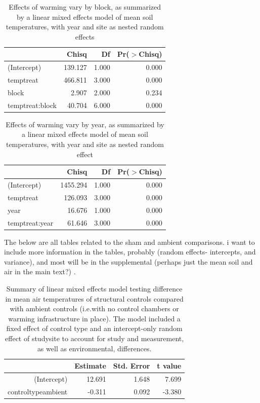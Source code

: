 \documentclass{article}
\begin{document}
\begin{table}[ht]
\centering
\begin{tabular}{lrrr}
  \hline
 & Chisq & Df & Pr($>$Chisq) \\ 
  \hline
(Intercept) & 139.127 & 1.000 & 0.000 \\ 
  temptreat & 466.811 & 3.000 & 0.000 \\ 
  block & 2.907 & 2.000 & 0.234 \\ 
  temptreat:block & 40.704 & 6.000 & 0.000 \\ 
   \hline
\end{tabular}
\caption{Effects of warming vary by block, as summarized by a linear mixed effects model of mean soil temperatures, with year and site as nested random effects} 
\end{table}
\begin{table}[ht]
\centering
\begin{tabular}{lrrr}
  \hline
 & Chisq & Df & Pr($>$Chisq) \\ 
  \hline
(Intercept) & 1455.294 & 1.000 & 0.000 \\ 
  temptreat & 126.093 & 3.000 & 0.000 \\ 
  year & 16.676 & 1.000 & 0.000 \\ 
  temptreat:year & 61.646 & 3.000 & 0.000 \\ 
   \hline
\end{tabular}
\caption{Effects of warming vary by year, as summarized by a linear mixed effects model of mean soil temperatures, with year and site as nested random effect} 
\end{table}\par The below are all tables related to the sham and ambient comparisons. i want to include more information in the tables, probably (random effects- intercepts, and variance), and most will be in the supplemental (perhaps just the mean soil and air in the main text?)
.
\par 
\begin{table}[ht]
\centering
\begin{tabular}{rrrr}
  \hline
 & Estimate & Std. Error & t value \\ 
  \hline
(Intercept) & 12.691 & 1.648 & 7.699 \\ 
  controltypeambient & -0.311 & 0.092 & -3.380 \\ 
   \hline
\end{tabular}
\caption{Summary of linear mixed effects model testing difference in mean air temperatures of structural controls compared with ambient controls (i.e.with no control chambers or warming infrastructure in place). The model included a fixed effect of control type and an intercept-only random effect of studysite to account for study and measurement, as well as environmental, differences.} 
\end{table}
\end{document}
